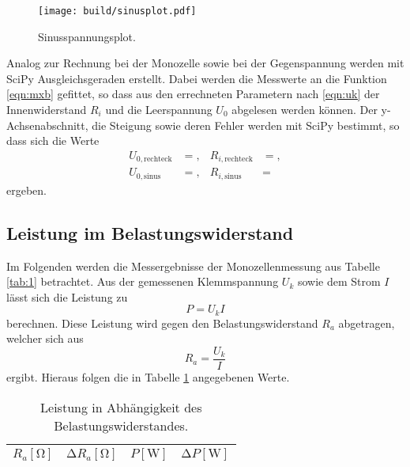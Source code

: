 \begin{figure}[H]
  \centering
  \texttt{[image: build/sinusplot.pdf]}
  \caption{Sinusspannungsplot.}
  \label{fig:4}
\end{figure}
Analog zur Rechnung bei der Monozelle sowie bei der Gegenspannung werden mit SciPy Ausgleichsgeraden erstellt.
Dabei werden die Messwerte an die Funktion \ref{eqn:mxb} gefittet, so dass aus den errechneten Parametern nach \ref{eqn:uk} der Innenwiderstand $R_i$ und die Leerspannung $U_0$ abgelesen werden können.
Der y-Achsenabschnitt, die Steigung sowie deren Fehler werden mit SciPy bestimmt, so dass sich die Werte
\begin{align*}
  U_{0,{\text{rechteck}}}  &= ,  & R_{i,\text{rechteck}}  &= ,\\
  U_{0,{\text{sinus}}} &= , & R_{i,\text{sinus}} &= 
\end{align*}
ergeben.

\subsection{Leistung im Belastungswiderstand}
Im Folgenden werden die Messergebnisse der Monozellenmessung aus Tabelle \ref{tab:1} betrachtet.
Aus der gemessenen Klemmspannung $U_k$ sowie dem Strom $I$ lässt sich die Leistung zu
\begin{equation}
  P = U_k I
\end{equation}
berechnen.
Diese Leistung wird gegen den Belastungswiderstand $R_a$ abgetragen, welcher sich aus
\begin{equation}
  R_a = \frac{U_k}{I}
\end{equation}
ergibt.
Hieraus folgen die in Tabelle \ref{tab:leistung} angegebenen Werte.

\begin{table}
  \centering
  \caption{Leistung in Abhängigkeit des Belastungswiderstandes.}
  \label{tab:leistung}
  \begin{tabular}{c c c c}
    \toprule
    {$R_a [\si{\ohm}]$} & {$\increment R_a [\si{\ohm}]$} & {$P [\si{\watt}]$} & {$\increment P [\si{\watt}]$} \\
    \midrule
    
    \bottomrule
  \end{tabular}
\end{table}

